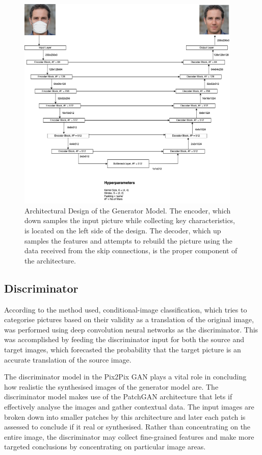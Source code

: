 \documentclass{36_styles/svproc}
\begin{document}
\begin{figure}[ht]%
\centering
\includegraphics[width=0.95\textwidth]{36_figures/generator.png}
\caption{Architectural Design of the Generator Model. The encoder, which down samples the input picture while collecting key characteristics, is located on the left side of the design. The decoder, which up samples the features and attempts to rebuild the picture using the data received from the skip connections, is the proper component of the architecture.}\label{fig2}
\end{figure}

\subsection{Discriminator}\label{subsec4}

According to the method used, conditional-image classification, which tries to categorise pictures based on their validity as a translation of the original image, was performed using deep convolution neural networks as the discriminator. This was accomplished by feeding the discriminator input for both the source and target images, which forecasted the probability that the target picture is an accurate translation of the source image.

The discriminator model in the Pix2Pix GAN plays a vital role in concluding how realistic the synthesised images of the generator model are. The discriminator model makes use of the PatchGAN architecture that lets if effectively analyse the images and gather contextual data. The input images are broken down into smaller patches by this architecture and later each patch is assessed to conclude if it real or synthesised. Rather than concentrating on the entire image, the discriminator may collect fine-grained features and make more targeted conclusions by concentrating on particular image areas.
\end{document}
